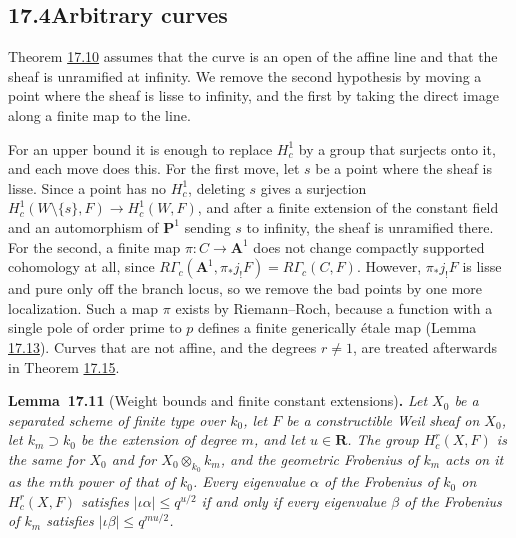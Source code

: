 \documentclass[11pt]{article}
\newenvironment{bpstatement}[2]{\par\addvspace{0.6\baselineskip}\noindent\textbf{#1}#2\textbf{.}\enspace\ignorespaces}
  {\par\addvspace{0.4\baselineskip}}
\newenvironment{bpstatementit}[2]{\begin{bpstatement}{#1}{#2}\itshape\ignorespaces}{\end{bpstatement}}
\begin{document}
\subsection*{\texorpdfstring{17.4\quad Arbitrary curves}{17.4 Arbitrary curves}}
\label{bp33}%
\label{bp34}%
Theorem \hyperref[bp30]{17.10} assumes that the curve is an open of the affine line and that the sheaf is unramified at infinity. We remove the second hypothesis by moving a point where the sheaf is lisse to infinity, and the first by taking the direct image along a finite map to the line.

For an upper bound it is enough to replace \(H^1_c\) by a group that surjects onto it, and each move does this. For the first move, let \(s\) be a point where the sheaf is lisse. Since a point has no \(H^1_c\), deleting \(s\) gives a surjection \(H^1_c(W\setminus\{s\},F)\to H^1_c(W,F)\), and after a finite extension of the constant field and an automorphism of \(\mathbf P^1\) sending \(s\) to infinity, the sheaf is unramified there. For the second, a finite map \(\pi:C\to\mathbf A^1\) does not change compactly supported cohomology at all, since \(R\Gamma_c(\mathbf A^1,\pi_*j_!F)=R\Gamma_c(C,F)\). However, \(\pi_*j_!F\) is lisse and pure only off the branch locus, so we remove the bad points by one more localization. Such a map \(\pi\) exists by Riemann–Roch, because a function with a single pole of order prime to \(p\) defines a finite generically étale map (Lemma \hyperref[bp41]{17.13}). Curves that are not affine, and the degrees \(r\ne1\), are treated afterwards in Theorem \hyperref[bp47]{17.15}.

\label{bp35}%
\begin{bpstatementit}{Lemma~17.11}{ (Weight bounds and finite constant extensions)}
Let \(X_0\) be a separated scheme of finite type over \(k_0\), let \(F\) be a constructible Weil sheaf on \(X_0\), let \(k_m\supset k_0\) be the extension of degree \(m\), and let \(u\in\mathbf R\). The group \(H^r_c(X,F)\) is the same for \(X_0\) and for \(X_0\otimes_{k_0}k_m\), and the geometric Frobenius of \(k_m\) acts on it as the \(m\)th power of that of \(k_0\). Every eigenvalue \(\alpha\) of the Frobenius of \(k_0\) on \(H^r_c(X,F)\) satisfies \(|\iota\alpha|\le q^{u/2}\) if and only if every eigenvalue \(\beta\) of the Frobenius of \(k_m\) satisfies \(|\iota\beta|\le q^{mu/2}\).
\end{bpstatementit}
\end{document}
